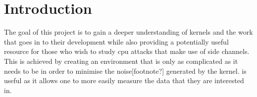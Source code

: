 \section{Introduction}\label{s:intro}


The goal of this project is to gain a deeper understanding of kernels and the work that goes in to their development while also providing a potentially useful resource for those who wish to study cpu attacks that make use of side channels. This is achieved by creating an environment that is only as complicated as it needs to be in order to minimise the noise[footnote?] generated by the kernel.  is useful as it allows one to more easily measure the data that they are interested in.


